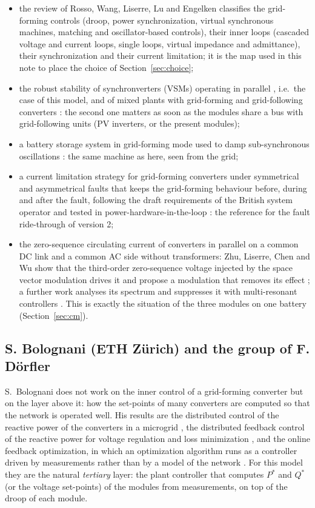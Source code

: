 \documentclass[11pt,a4paper]{scrartcl}
\begin{document}
\begin{onehalfspace}
\begin{itemize}[nosep]
	\item the review of Rosso, Wang, Liserre, Lu and Engelken \cite{rosso2021} classifies the grid-forming controls (droop, power synchronization, virtual synchronous machines, matching and oscillator-based controls), their inner loops (cascaded voltage and current loops, single loops, virtual impedance and admittance), their synchronization and their current limitation; it is the map used in this note to place the choice of Section~\ref{sec:choice};
	\item the robust stability of synchronverters (VSMs) operating in parallel \cite{rosso2019}, i.e.\ the case of this model, and of mixed plants with grid-forming and grid-following converters \cite{rosso2020}: the second one matters as soon as the modules share a bus with grid-following units (PV inverters, or the present modules);
	\item a battery storage system in grid-forming mode used to damp sub-synchronous oscillations \cite{zhou2022}: the same machine as here, seen from the grid;
	\item a current limitation strategy for grid-forming converters under symmetrical and asymmetrical faults that keeps the grid-forming behaviour before, during and after the fault, following the draft requirements of the British system operator and tested in power-hardware-in-the-loop \cite{kiel_curlim}: the reference for the fault ride-through of version 2;
	\item the zero-sequence circulating current of converters in parallel on a common DC link and a common AC side without transformers: Zhu, Liserre, Chen and Wu show that the third-order zero-sequence voltage injected by the space vector modulation drives it and propose a modulation that removes its effect \cite{zhu2017}; a further work analyses its spectrum and suppresses it with multi-resonant controllers \cite{kiel_zscc}. This is exactly the situation of the three modules on one battery (Section~\ref{sec:cm}).
\end{itemize}

\subsection{S. Bolognani (ETH Z\"urich) and the group of F. D\"orfler}

S.~Bolognani does not work on the inner control of a grid-forming converter but on the layer above it: how the set-points of many converters are computed so that the network is operated well. His results are the distributed control of the reactive power of the converters in a microgrid \cite{bolognani2013}, the distributed feedback control of the reactive power for voltage regulation and loss minimization \cite{bolognani2015}, and the online feedback optimization, in which an optimization algorithm runs as a controller driven by measurements rather than by a model of the network \cite{hauswirth2024}. For this model they are the natural \emph{tertiary} layer: the plant controller that computes $P^*$ and $Q^*$ (or the voltage set-points) of the modules from measurements, on top of the droop of each module.


\end{onehalfspace}
\end{document}
